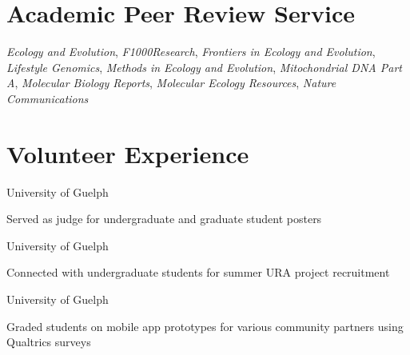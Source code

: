 \section{Academic Peer Review Service}
\textit{Ecology and Evolution}, \textit{F1000Research}, \textit{Frontiers in
Ecology and Evolution}, \textit{Lifestyle Genomics}, \textit{Methods in Ecology and Evolution}, \textit{Mitochondrial DNA
Part A},  \textit{Molecular Biology
Reports}, \textit{Molecular Ecology Resources}, \textit{Nature
Communications}


\section{Volunteer Experience}

University of Guelph
\begin{cvbullets}
  \item Served as judge for undergraduate and graduate student posters
\end{cvbullets}

\medskip

University of Guelph
\begin{cvbullets}
  \item Connected with undergraduate students for summer URA project recruitment
\end{cvbullets}

\medskip
{}
University of Guelph
\begin{cvbullets}
  \item Graded students on mobile app prototypes for various community partners using Qualtrics surveys
\end{cvbullets}


